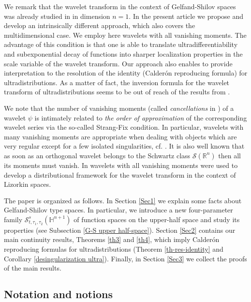 \documentclass[reqno,12pt]{amsart}
\theoremstyle{plain}
\theoremstyle{definition}
\theoremstyle{remark}
\begin{document}
\par

We remark that the wavelet transform in the context of
Gelfand-Shilov spaces was already studied in \cite{pa06,pa09} in
dimension $n=1$. In the present article we propose and develop an
intrinsically different approach, which also covers the
multidimensional case. We employ here wavelets with all vanishing
moments. The advantage of this condition is that one is able to
translate ultradifferentiability and subexponential decay of
functions into sharper localization properties in the scale variable
of the wavelet transform. Our approach also enables to provide
interpretation to the resolution of the identity (Calder\'{o}n
reproducing formula) for ultradistributions. As a matter of fact,
the inversion formula for the wavelet transform of
ultradistributions seems to be out of reach of the results from
\cite{pa06,pa09}.

We note that the number of vanishing moments (called {\em
cancellations} in \cite{M}) of a wavelet $\psi$ is intimately
related to {\em the order of approximation} of the corresponding
wavelet series via the so-called Strang-Fix condition. In
particular, wavelets with many vanishing moments are appropriate
when dealing with objects which are very regular except for a few
isolated singularities, cf. \cite{Dau,Mallat}. It is also well known
\cite{HW} that as soon as an orthogonal wavelet belongs to the
Schwartz class $\mathcal{S}(\mathbb{R}^{n})$ then all its moments
must vanish. In \cite{hol1} wavelets with all vanishing moments were
used to develop a distributional framework for the wavelet transform
in the context of Lizorkin spaces.

\par

The paper is organized as follows. In Section \ref{Sec1} we explain some facts about Gelfand-Shilov type spaces. In particular, we introduce a new four-parameter family $
\mathcal{S}^{s}_{t, \tau_1, \tau_2} (\mathbb{H}^{n+1}) $ of function spaces on the upper-half space and study its properties (see Subsection \ref{G-S upper half-space}). Section \ref{Sec2} contains our main continuity results, Theorems \ref{th3} and \ref{th4}, which imply Calder\'{o}n reproducing formulas for ultradistributions (Theorem \ref{th-res-identity} and Corollary \ref{desingularization ultra}). Finally, in Section \ref{Sec3} we collect the proofs of the main results.

\subsection{Notation and notions}
\end{document}
